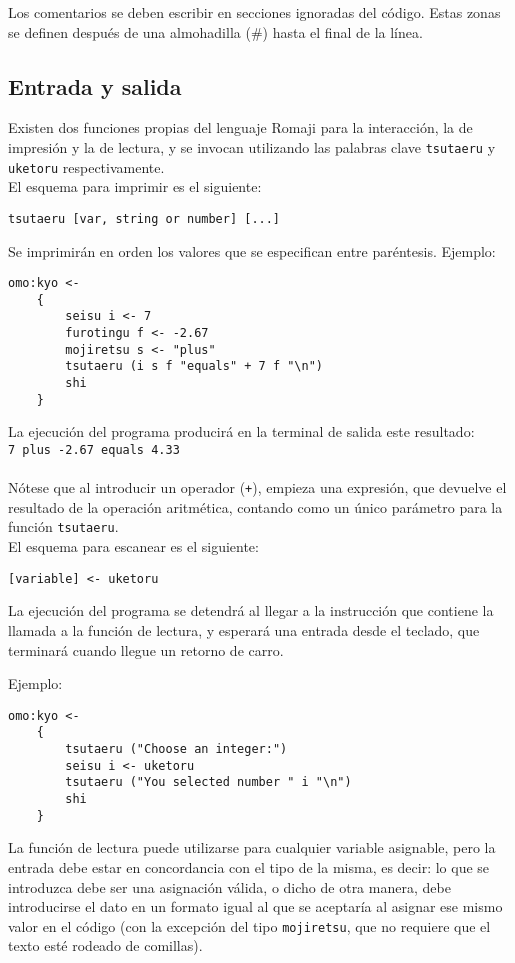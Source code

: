 \documentclass[spanish]{article}
\begin{document}
Los comentarios se deben escribir en secciones ignoradas del código. Estas zonas se definen después de una almohadilla (\#) hasta el final de la línea.

\subsection{Entrada y salida}
\label{sec:entrada-salida}

Existen dos funciones propias del lenguaje Romaji para la interacción, la de impresión y la de lectura, y se invocan utilizando las palabras clave \texttt{tsutaeru} y \texttt{uketoru} respectivamente.\\

El esquema para imprimir es el siguiente:

\begin{lstlisting}[language=Romaji]
    tsutaeru [var, string or number] [...]
\end{lstlisting}
Se imprimirán en orden los valores que se especifican entre paréntesis. Ejemplo:

\begin{lstlisting}[language=Romaji]
    omo:kyo <- 
    {
        seisu i <- 7
        furotingu f <- -2.67
        mojiretsu s <- "plus"
        tsutaeru (i s f "equals" + 7 f "\n")
        shi
    }
\end{lstlisting}
La ejecución del programa producirá en la terminal de salida este resultado:\\

\texttt{7 plus -2.67 equals 4.33}\\
\hspace{0pt}\\
Nótese que al introducir un operador (\texttt{+}), empieza una expresión, que devuelve el resultado de la operación aritmética, contando como un único parámetro para la función \texttt{tsutaeru}.\\

El esquema para escanear es el siguiente:
\begin{lstlisting}[language=Romaji]
    [variable] <- uketoru
\end{lstlisting}
La ejecución del programa se detendrá al llegar a la instrucción que contiene la llamada a la función de lectura, y esperará una entrada desde el teclado, que terminará cuando llegue un retorno de carro.

Ejemplo:
\begin{lstlisting}[language=Romaji]
    omo:kyo <- 
    {
        tsutaeru ("Choose an integer:")
        seisu i <- uketoru
        tsutaeru ("You selected number " i "\n")
        shi
    }
\end{lstlisting}
La función de lectura puede utilizarse para cualquier variable asignable, pero la entrada debe estar en concordancia con el tipo de la misma, es decir: lo que se introduzca debe ser una asignación válida, o dicho de otra manera, debe introducirse el dato en un formato igual al que se aceptaría al asignar ese mismo valor en el código (con la excepción del tipo \texttt{mojiretsu}, que no requiere que el texto esté rodeado de comillas).
\end{document}
